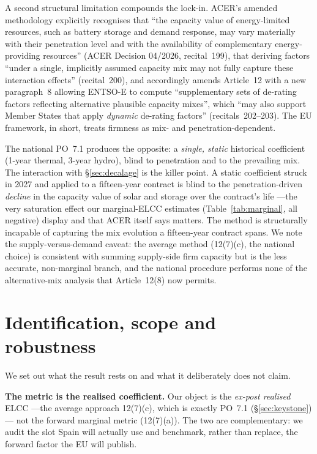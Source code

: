 \documentclass[11pt,a4paper]{article}
\begin{document}
A second structural limitation compounds the lock-in. ACER's amended methodology
explicitly recognises that ``the capacity value of energy-limited resources, such as
battery storage and demand response, may vary materially with their penetration level
and with the availability of complementary energy-providing resources'' (ACER
Decision 04/2026, recital~199), that deriving factors ``under a single, implicitly
assumed capacity mix may not fully capture these interaction effects'' (recital~200),
and accordingly amends Article~12 with a new paragraph~8 allowing ENTSO-E to compute
``supplementary sets of de-rating factors reflecting alternative plausible capacity
mixes'', which ``may also support Member States that apply \emph{dynamic} de-rating
factors'' (recitals~202--203). The EU framework, in short, treats firmness as
mix- and penetration-dependent.

The national PO~7.1 produces the opposite: a \emph{single, static} historical
coefficient (1-year thermal, 3-year hydro), blind to penetration and to the
prevailing mix. The interaction with \S\ref{sec:decalage} is the killer point. A
static coefficient struck in 2027 and applied to a fifteen-year contract is blind to
the penetration-driven \emph{decline} in the capacity value of solar and storage over
the contract's life ---the very saturation effect our marginal-ELCC estimates
(Table~\ref{tab:marginal}, all negative) display and that ACER itself says matters.
The method is structurally incapable of capturing the mix evolution a fifteen-year
contract spans. We note the supply-versus-demand caveat: the average method
(12(7)(c), the national choice) is consistent with summing supply-side firm capacity
but is the less accurate, non-marginal branch, and the national procedure performs
none of the alternative-mix analysis that Article~12(8) now permits.

\section{Identification, scope and robustness}
\label{sec:robust}

We set out what the result rests on and what it deliberately does not claim.

\textbf{The metric is the realised coefficient.} Our object is the \emph{ex-post
realised} ELCC ---the average approach 12(7)(c), which is exactly PO~7.1
(\S\ref{sec:keystone})--- not the forward marginal metric (12(7)(a)). The two are
complementary: we audit the slot Spain will actually use and benchmark, rather than
replace, the forward factor the EU will publish.
\end{document}
